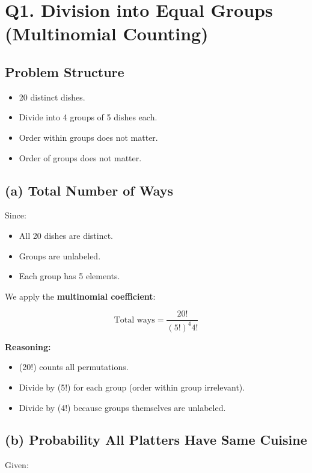 \documentclass[12pt]{article}
\begin{document}
\section*{Q1. Division into Equal Groups (Multinomial Counting)}

\subsection*{Problem Structure}

\begin{itemize}
    \item 20 distinct dishes.
    \item Divide into 4 groups of 5 dishes each.
    \item Order within groups does not matter.
    \item Order of groups does not matter.
\end{itemize}

\subsection*{(a) Total Number of Ways}

Since:

\begin{itemize}
    \item All 20 dishes are distinct.
    \item Groups are unlabeled.
    \item Each group has 5 elements.
\end{itemize}

We apply the \textbf{multinomial coefficient}:

\[
\text{Total ways} = \frac{20!}{(5!)^4 4!}
\]

\textbf{Reasoning:}

\begin{itemize}
    \item (20!) counts all permutations.
    \item Divide by (5!) for each group (order within group irrelevant).
    \item Divide by (4!) because groups themselves are unlabeled.
\end{itemize}

\subsection*{(b) Probability All Platters Have Same Cuisine}

Given:
\end{document}
